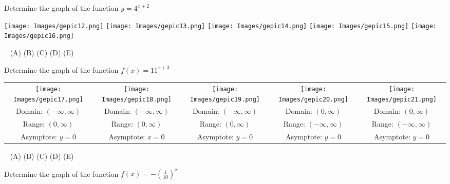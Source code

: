 \documentclass[12pt,
]{exam}
\newcounter{quest}
\begin{document}
\begin{questions}
\begin{multicols}{2}
\end{multicols}


\question
Determine the graph of the function $y=4^{x+2}$

\texttt{[image: Images/gepic12.png]}
     \texttt{[image: Images/gepic13.png]}
          \texttt{[image: Images/gepic14.png]}
               \texttt{[image: Images/gepic15.png]}
                    \texttt{[image: Images/gepic16.png]}
   
  ~\hspace{1cm} (A) \hspace{2.5cm} (B)  \hspace{2.8cm} (C) \hspace{3cm} (D) \hspace{3cm} (E)


\question
Determine the graph of the function $f(x)=11^{x+3}$

\begin{tabular}{ccccc}
\texttt{[image: Images/gepic17.png]}&
     \texttt{[image: Images/gepic18.png]}&
          \texttt{[image: Images/gepic19.png]}&
               \texttt{[image: Images/gepic20.png]}&
                    \texttt{[image: Images/gepic21.png]}\\
  \footnotesize  Domain: $(-\infty, \infty)$ &     Domain: $(-\infty, \infty)$ &     Domain: $(-\infty, \infty)$&   Domain: $(0, \infty)$&    Domain: $(0, \infty)$\\
    Range: $(0, \infty)$  & Range: $(0, \infty)$ &Range: $(0, \infty)$  & Range: $(-\infty, \infty)$ & Range: $(-\infty, \infty)$ \\
    Asymptote: $y = 0$&
Asymptote: $x = 0$&
Asymptote: $y = 0$&
Asymptote: $y = 0$&
Asymptote: $y = 0$\\
    \end{tabular}
   
  ~\hspace{1cm} (A) \hspace{2.5cm} (B)  \hspace{2.8cm} (C) \hspace{3cm} (D) \hspace{3cm} (E)



\question
Determine the graph of the function $f(x)=-(\frac{1}{10})^x$


\end{questions}
\end{document}
